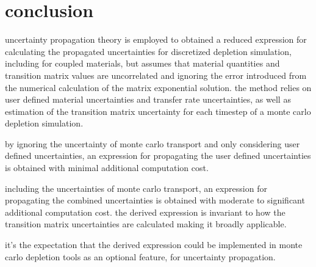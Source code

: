 \documentclass[a4paper]{article}
\begin{document}
\section*{conclusion}
uncertainty propagation theory is employed to obtained a reduced expression for calculating the propagated uncertainties for discretized depletion simulation, including for coupled materials, but assumes that material quantities and transition matrix values are uncorrelated and ignoring the error introduced from the numerical calculation of the matrix exponential solution. the method relies on user defined material uncertainties and transfer rate uncertainties, as well as estimation of the transition matrix uncertainty for each timestep of a monte carlo depletion simulation.

by ignoring the uncertainty of monte carlo transport and only considering user defined uncertainties, an expression for propagating the user defined uncertainties is obtained with minimal additional computation cost.

including the uncertainties of monte carlo transport, an expression for propagating the combined uncertainties is obtained with moderate to significant additional computation cost. the derived expression is invariant to how the transition matrix uncertainties are calculated making it broadly applicable.

it's the expectation that the derived expression could be implemented in monte carlo depletion tools as an optional feature, for uncertainty propagation.
\end{document}
